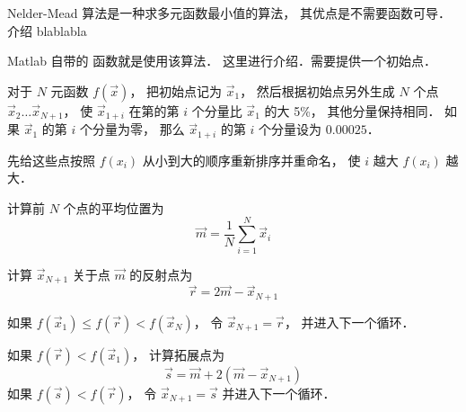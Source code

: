 

Nelder-Mead 算法是一种求多元函数最小值的算法， 其优点是不需要函数可导． 介绍 blablabla

Matlab 自带的  函数就是使用该算法． 这里进行介绍．需要提供一个初始点．

对于 $N$ 元函数 $f(\vec x)$， 把初始点记为 $\vec x_1$， 然后根据初始点另外生成 $N$ 个点 $\vec x_2\dots\vec x_{N + 1}$， 使 $\vec x_{1 + i}$ 在第的第 $i$ 个分量比 $\vec x_1$ 的大 5\%， 其他分量保持相同． 如果 $\vec x_1$ 的第 $i$ 个分量为零， 那么 $\vec x_{1 + i}$ 的第 $i$ 个分量设为 $0.00025$．

先给这些点按照 $f(x_i)$ 从小到大的顺序重新排序并重命名， 使 $i$ 越大 $f(x_i)$ 越大．

计算前 $N$ 个点的平均位置为
\begin{equation}
\vec m = \frac 1N \sum_{i=1}^N \vec x_i
\end{equation}


计算 $\vec x_{N + 1}$ 关于点 $\vec m$ 的反射点为
\begin{equation}
\vec r = 2\vec m - \vec x_{N + 1}
\end{equation}

如果 $f(\vec x_1) \le f(\vec r) < f(\vec x_N)$， 令 $\vec x_{N+1} = \vec r$， 并进入下一个循环．

如果 $f(\vec r) < f(\vec x_1)$， 计算拓展点为
\begin{equation}
\vec s = \vec m + 2(\vec m - \vec x_{N+1})
\end{equation}
如果 $f(\vec s) < f(\vec r)$， 令 $\vec x_{N+1} = \vec s$ 并进入下一个循环．